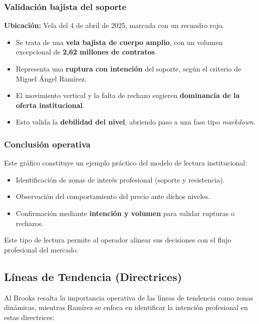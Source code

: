 \subsubsection*{Validaci\'on bajista del soporte}

\textbf{Ubicaci\'on:} Vela del 4 de abril de 2025, marcada con un recuadro rojo.

\begin{itemize}
    \item Se trata de una \textbf{vela bajista de cuerpo amplio}, con un volumen excepcional de \textbf{2{,}62 millones de contratos}.
    \item Representa una \textbf{ruptura con intenci\'on} del soporte, seg\'un el criterio de Miguel \'Angel Ram\'irez.
    \item El movimiento vertical y la falta de rechazo sugieren \textbf{dominancia de la oferta institucional}.
    \item Esto valida la \textbf{debilidad del nivel}, abriendo paso a una fase tipo \textit{markdown}.
\end{itemize}

\subsubsection*{Conclusi\'on operativa}

Este gr\'afico constituye un ejemplo pr\'actico del modelo de lectura institucional:

\begin{itemize}
    \item Identificaci\'on de zonas de inter\'es profesional (soporte y resistencia).
    \item Observaci\'on del comportamiento del precio ante dichos niveles.
    \item Confirmaci\'on mediante \textbf{intenci\'on y volumen} para validar rupturas o rechazos.
\end{itemize}

Este tipo de lectura permite al operador alinear sus decisiones con el flujo profesional del mercado.

\subsection{L\'ineas de Tendencia (Directrices)}

Al Brooks resalta la importancia operativa de las l\'ineas de tendencia como zonas din\'amicas, mientras Ram\'irez se enfoca en identificar la intenci\'on profesional en estas directrices:

